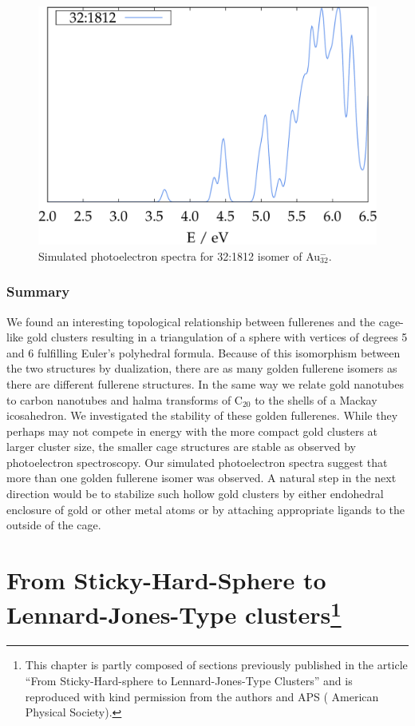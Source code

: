 \begin{figure}[htbp]
\begin{center}
\includegraphics[width=.8\textwidth]{golddual/photo/Au32/nonrel/compare.pdf}
\caption{Simulated photoelectron spectra for 32:1812 isomer of Au$_{32}^-$.}
  \label{fig:photo_Au32}
\end{center}
\end{figure}


\subsection{Summary}

We found an interesting topological relationship between fullerenes and the
cage-like gold clusters resulting in a triangulation of a sphere with vertices
of degrees 5 and 6 fulfilling Euler's polyhedral formula. Because of this
isomorphism between the two structures by dualization, there are as many golden
fullerene isomers as there are different fullerene structures. In the same way
we relate gold nanotubes to carbon nanotubes and halma transforms of C$_{20}$
to the shells of a Mackay icosahedron. We investigated the stability of these
golden fullerenes. While they perhaps may not compete in energy with the more
compact gold clusters at larger cluster size, the smaller cage structures are
stable as observed by photoelectron spectroscopy. Our simulated photoelectron
spectra suggest that more than one golden fullerene isomer was observed. A
natural step in the next direction would be to stabilize such hollow gold
clusters by either endohedral enclosure of gold or other metal atoms or by
attaching appropriate ligands to the outside of the cage.

\chapter[From Sticky-Hard-Sphere to Lennard-Jones-Type clusters]{
    From Sticky-Hard-Sphere to Lennard-Jones-Type clusters\footnote{This
    chapter is partly composed of sections previously published in the article
    ``From Sticky-Hard-sphere to Lennard-Jones-Type Clusters''\autocite{} and
    is reproduced with kind permission from the authors and APS ( American Physical Society).}
}
\label{sec:fromstickyhardspheretoLJtypeclusters}


